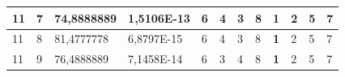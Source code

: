 \documentclass[conference]{IEEEtran}
\begin{document}
\begin{table}[]
\begin{tabular}{|llll|llllllll|}
\multicolumn{1}{|l|}{11}                                                    & \multicolumn{1}{l|}{7}                                                        & \multicolumn{1}{l|}{74,8888889}                                                   & 1,5106E-13                     & \multicolumn{1}{l|}{6}                                                  & \multicolumn{1}{l|}{4}                                                  & \multicolumn{1}{l|}{3}                                                  & \multicolumn{1}{l|}{8}                                                  & \multicolumn{1}{l|}{\textbf{1}}                                         & \multicolumn{1}{l|}{2}                                                  & \multicolumn{1}{l|}{5}                                                  & 7                          \\ \hline
\multicolumn{1}{|l|}{11}                                                    & \multicolumn{1}{l|}{8}                                                        & \multicolumn{1}{l|}{81,4777778}                                                   & 6,8797E-15                     & \multicolumn{1}{l|}{6}                                                  & \multicolumn{1}{l|}{4}                                                  & \multicolumn{1}{l|}{3}                                                  & \multicolumn{1}{l|}{8}                                                  & \multicolumn{1}{l|}{\textbf{1}}                                         & \multicolumn{1}{l|}{2}                                                  & \multicolumn{1}{l|}{5}                                                  & 7                          \\ \hline
\multicolumn{1}{|l|}{11}                                                    & \multicolumn{1}{l|}{9}                                                        & \multicolumn{1}{l|}{76,4888889}                                                   & 7,1458E-14                     & \multicolumn{1}{l|}{6}                                                  & \multicolumn{1}{l|}{3}                                                  & \multicolumn{1}{l|}{4}                                                  & \multicolumn{1}{l|}{8}                                                  & \multicolumn{1}{l|}{\textbf{1}}                                         & \multicolumn{1}{l|}{2}                                                  & \multicolumn{1}{l|}{5}                                                  & 7                          \\ \hline

\end{tabular}
\end{table}
\end{document}
